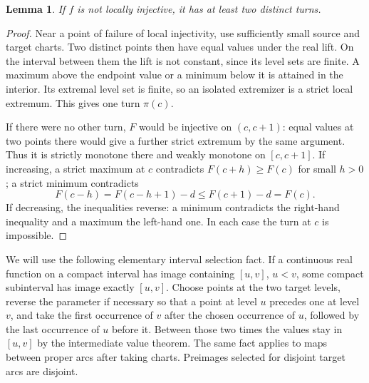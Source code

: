 \documentclass[11pt]{article}
\newtheorem{lemma}[theorem]{Lemma}
\begin{document}
\begin{lemma}\label{lem:turns}
If $f$ is not locally injective, it has at least two distinct turns.
\end{lemma}
\begin{proof}
Near a point of failure of local injectivity, use sufficiently small source and target charts. Two distinct points then have equal values under the real lift. On the interval between them the lift is not constant, since its level sets are finite. A maximum above the endpoint value or a minimum below it is attained in the interior. Its extremal level set is finite, so an isolated extremizer is a strict local extremum. This gives one turn $\pi(c)$.

If there were no other turn, $F$ would be injective on $(c,c+1)$: equal values at two points there would give a further strict extremum by the same argument. Thus it is strictly monotone there and weakly monotone on $[c,c+1]$. If increasing, a strict maximum at $c$ contradicts $F(c+h)\ge F(c)$ for small $h>0$; a strict minimum contradicts
\[
 F(c-h)=F(c-h+1)-d\le F(c+1)-d=F(c).
\]
If decreasing, the inequalities reverse: a minimum contradicts the right-hand inequality and a maximum the left-hand one. In each case the turn at $c$ is impossible.
\end{proof}

We will use the following elementary interval selection fact. If a continuous real function on a compact interval has image containing $[u,v]$, $u<v$, some compact subinterval has image exactly $[u,v]$. Choose points at the two target levels, reverse the parameter if necessary so that a point at level $u$ precedes one at level $v$, and take the first occurrence of $v$ after the chosen occurrence of $u$, followed by the last occurrence of $u$ before it. Between those two times the values stay in $[u,v]$ by the intermediate value theorem. The same fact applies to maps between proper arcs after taking charts. Preimages selected for disjoint target arcs are disjoint.
\end{document}
